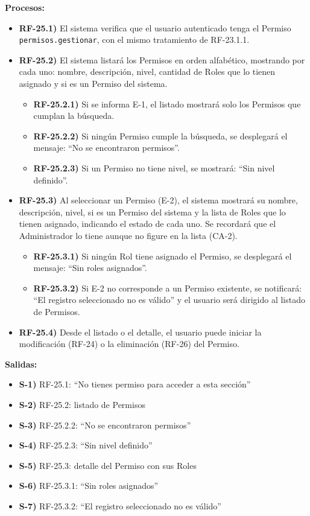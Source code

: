 \textbf{Procesos:}
\begin{itemize}[label={}, leftmargin=1.5em]
  \item \textbf{RF-25.1)} El sistema verifica que el usuario autenticado tenga el Permiso \texttt{permisos.gestionar}, con el mismo tratamiento de RF-23.1.1.
  \item \textbf{RF-25.2)} El sistema listar\'a los Permisos en orden alfab\'etico, mostrando por cada uno: nombre, descripci\'on, nivel, cantidad de Roles que lo tienen asignado y si es un Permiso del sistema.
  \begin{itemize}[label={}, leftmargin=1.5em]
    \item \textbf{RF-25.2.1)} Si se informa E-1, el listado mostrar\'a solo los Permisos que cumplan la b\'usqueda.
    \item \textbf{RF-25.2.2)} Si ning\'un Permiso cumple la b\'usqueda, se desplegar\'a el mensaje: ``No se encontraron permisos''.
    \item \textbf{RF-25.2.3)} Si un Permiso no tiene nivel, se mostrar\'a: ``Sin nivel definido''.
  \end{itemize}
  \item \textbf{RF-25.3)} Al seleccionar un Permiso (E-2), el sistema mostrar\'a su nombre, descripci\'on, nivel, si es un Permiso del sistema y la lista de Roles que lo tienen asignado, indicando el estado de cada uno. Se recordar\'a que el Administrador lo tiene aunque no figure en la lista (CA-2).
  \begin{itemize}[label={}, leftmargin=1.5em]
    \item \textbf{RF-25.3.1)} Si ning\'un Rol tiene asignado el Permiso, se desplegar\'a el mensaje: ``Sin roles asignados''.
    \item \textbf{RF-25.3.2)} Si E-2 no corresponde a un Permiso existente, se notificar\'a: ``El registro seleccionado no es v\'alido'' y el usuario ser\'a dirigido al listado de Permisos.
  \end{itemize}
  \item \textbf{RF-25.4)} Desde el listado o el detalle, el usuario puede iniciar la modificaci\'on (RF-24) o la eliminaci\'on (RF-26) del Permiso.
\end{itemize}

\textbf{Salidas:}
\begin{itemize}[label={}, leftmargin=1.5em]
  \item \textbf{S-1)} RF-25.1: ``No tienes permiso para acceder a esta secci\'on''
  \item \textbf{S-2)} RF-25.2: listado de Permisos
  \item \textbf{S-3)} RF-25.2.2: ``No se encontraron permisos''
  \item \textbf{S-4)} RF-25.2.3: ``Sin nivel definido''
  \item \textbf{S-5)} RF-25.3: detalle del Permiso con sus Roles
  \item \textbf{S-6)} RF-25.3.1: ``Sin roles asignados''
  \item \textbf{S-7)} RF-25.3.2: ``El registro seleccionado no es v\'alido''
\end{itemize}

